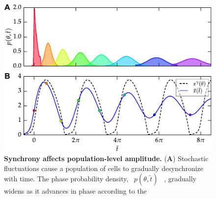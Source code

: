 \documentclass[11pt, letterpaper]{article}
\providecommand{\DIFadd}[1]{{\protect\color{blue}#1}} %
\providecommand{\DIFdel}[1]{{\protect\color{red}}}                      %
\providecommand{\DIFaddFL}[1]{\DIFadd{#1}} %
\providecommand{\DIFdelFL}[1]{\DIFdel{#1}} %
\providecommand{\DIFaddbeginFL}{} %
\providecommand{\DIFaddendFL}{} %
\providecommand{\DIFdelbeginFL}{} %
\providecommand{\DIFdelendFL}{} %
\begin{document}
\begin{figure}[tbp]
  \begin{center}
    \DIFaddbeginFL \includegraphics[width=.75\textwidth]{figures/figure_3.pdf}
    \DIFaddendFL \caption{
{\bfseries \DIFdelbeginFL \DIFdelFL{Response curves for a population of oscillators.}%
\DIFdelFL{A
    temporary parameter change, which induces both a phase response and
    }\DIFdelendFL \DIFaddbeginFL \DIFaddFL{Synchrony affects population-level }\DIFaddendFL amplitude\DIFdelbeginFL \DIFdelFL{change, is applied to a population of oscillators}\DIFdelendFL .\DIFaddbeginFL }
\DIFaddendFL ({\bfseries A}) \DIFdelbeginFL \DIFdelFL{The phase response curves are shown for both the single limit cycle
    oscillator and }\DIFdelendFL \DIFaddbeginFL \DIFaddFL{Stochastic fluctuations cause a }\DIFaddendFL population \DIFdelbeginFL \DIFdelFL{average, left.  The population-level amplitude
    response curve is shown together with the single-cell amplitude response,
    with both curves normalized }\DIFdelendFL \DIFaddbeginFL \DIFaddFL{of cells }\DIFaddendFL to \DIFdelbeginFL \DIFdelFL{\mbox{%
$\sigma=1$
}%
. (}%
\DIFdelFL{B-C}%
\DIFdelFL{)
    Population-level rhythms, \mbox{%
$\hat{x}(\hat{t})$
}%
resulting from perturbations
    given at the indicated phases in A (red and cyan lines, respectively)}\DIFdelendFL \DIFaddbeginFL \DIFaddFL{gradually desynchronize with time}\DIFaddendFL .
The \DIFdelbeginFL \DIFdelFL{population transitions from the unperturbed population}\DIFdelendFL \DIFaddbeginFL \DIFaddFL{phase probability density}\DIFaddendFL , \DIFdelbeginFL \DIFdelFL{\mbox{%
$\bar{x}(\hat{t})$
}%
}\DIFdelendFL \DIFaddbeginFL \DIFaddFL{\mbox{%
$p(\theta, \tilde{t})$
}%
}\DIFaddendFL , \DIFaddbeginFL \DIFaddFL{gradually widens as it advances in phase according }\DIFaddendFL to the \DIFdelbeginFL \DIFdelFL{steady-state perturbed population, \mbox{%
}}}
\end{center}
\end{figure}
\end{document}
